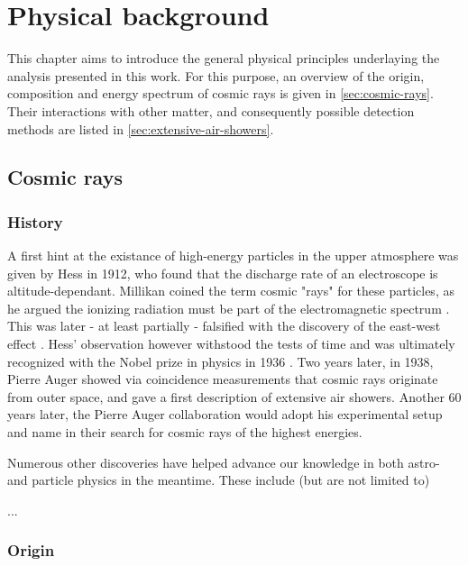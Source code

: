 
\chapter{Physical background}
\label{chap:physical-background}

This chapter aims to introduce the general physical principles underlaying the analysis presented in this work. For this purpose, an overview of 
the origin, composition and energy spectrum of cosmic rays is given in \autoref{sec:cosmic-rays}. Their interactions with other matter, and
consequently possible detection methods are listed in \autoref{sec:extensive-air-showers}.

\section{Cosmic rays}
\label{sec:cosmic-rays}

\subsection{History}
\label{ssec:cr-history}

A first hint at the existance of high-energy particles in the upper atmosphere was given by Hess in 1912, who found that the discharge rate of 
an electroscope is altitude-dependant. Millikan coined the term cosmic "rays" for these particles, as he argued the ionizing radiation must be 
part of the electromagnetic spectrum \cite{millikan1928origin}. This was later - at least partially - falsified with the discovery of the 
east-west effect \cite{johnson1938note}. Hess' observation however withstood the tests of time and  was ultimately recognized with the Nobel 
prize in physics in 1936 \cite{nobelprize1936}. Two years later, in 1938, Pierre Auger showed via coincidence measurements that cosmic rays 
originate from outer space, and gave a first description of extensive air showers. Another 60 years later, the Pierre Auger collaboration would 
adopt his experimental setup and name in their search for cosmic rays of the highest energies.

Numerous other discoveries have helped advance our knowledge in both astro- and particle physics in the meantime. These include (but are not 
limited to) 

... \TODO

\subsection{Origin}
\label{ssec:cr-origin}

